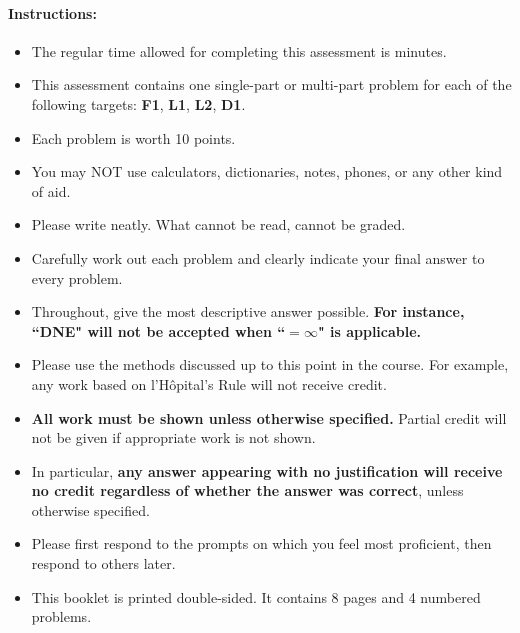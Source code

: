 \documentclass[11pt]{article}
\begin{document}
{%

\paragraph*{Instructions:}

\begin{itemize}
    
    \item The regular time allowed for completing this assessment is  minutes.
    \item This assessment contains one single-part or multi-part problem for each of the following targets: {\bf\color{ProcessBlue}F1}, {\bf\color{RoyalBlue}L1}, {\bf\color{RoyalBlue}L2}, {\bf\color{ForestGreen}D1}.
    \item Each problem is worth 10 points.
    \item You may NOT use calculators, dictionaries, notes, phones, or any other kind of aid.
    \item Please write neatly. What cannot be read, cannot be graded.
    \item Carefully work out each problem and clearly indicate your final answer to every problem.
    \item Throughout, give the most descriptive answer possible. \textbf{For instance, ``DNE" will not be accepted when ``$=\infty$" is applicable.}
    \item Please use the methods discussed up to this point in the course. For example, any work based on l'H\^opital's Rule will not receive credit.
    \item \textbf{All work must be shown unless otherwise specified.} Partial credit will not be given if appropriate work is not shown.
    \item In particular, {\bf any answer appearing with no justification will receive no credit regardless of whether the answer was correct}, unless otherwise specified.
    \item Please first respond to the prompts on which you feel most proficient, then respond to others later.
    \item This booklet is printed double-sided. It contains 8 pages and 4 numbered problems.
    \end{itemize}
    
    }
\end{document}
